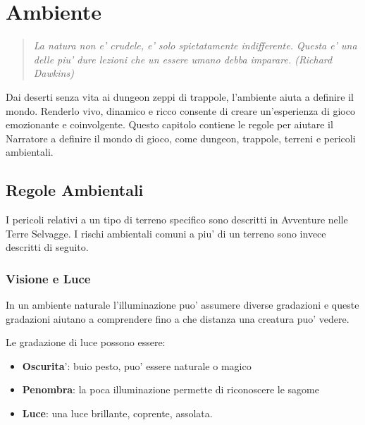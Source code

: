 \documentclass[a4paper,11pt,twoside,openany]{book}
\begin{document}
{\pagebreak

\section{Ambiente}

\label{ambiente}
\begin{quote}\textit{
La natura non e' crudele, e' solo spietatamente indifferente. Questa e' una delle piu' dure lezioni che un essere umano debba imparare. (Richard Dawkins)
}\end{quote}

Dai deserti senza vita ai dungeon zeppi di trappole, l'ambiente aiuta a definire il mondo. Renderlo vivo, dinamico e ricco consente di creare un'esperienza di gioco emozionante e coinvolgente. Questo capitolo contiene le regole per aiutare il Narratore a definire il mondo di gioco, come dungeon, trappole, terreni e pericoli ambientali.

\subsection{Regole Ambientali}

\label{regole-ambientali}

I pericoli relativi a un tipo di terreno specifico sono descritti in Avventure nelle Terre Selvagge. I rischi ambientali comuni a piu' di un terreno sono invece descritti di seguito.

\subsubsection{Visione e Luce}

\label{visione-e-luce}

In un ambiente naturale l'illuminazione puo' assumere diverse gradazioni e queste gradazioni aiutano a comprendere fino a che distanza una creatura puo' vedere.

Le gradazione di luce possono essere:
\begin{itemize}
\item 
\textbf{Oscurita}': buio pesto, puo' essere naturale o magico 
\item 
\textbf{Penombra}: la poca illuminazione permette di riconoscere le
sagome 
\item 
\textbf{Luce}: una luce brillante, coprente, assolata. 
\end{itemize}

\medskip

}
\end{document}
